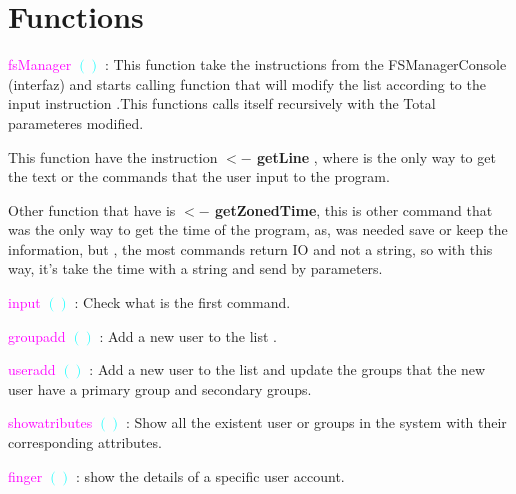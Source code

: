 \documentclass{aes2e}
\begin{document}
\section{Functions}



\begin{alphalist}[style=sameline]
\item{}\textcolor{Magenta}{fsManager } \textcolor{Cyan}{$()$} :   This function take the instructions from the FSManagerConsole (interfaz) and starts calling function that will modify the list according  to the input instruction .This functions calls itself recursively with the Total parameteres modified. \newline

This function have the instruction \textbf{ $<-$ getLine }, where is the only way to get the text or the commands that the user input to the program.\newline

Other function that have is \textbf{ $<-$ getZonedTime}, this is other command that was the only way to get the time of the program, as, was needed save or keep the information, but , the most commands return IO and not a string, so with this way, it's take the time with a string and send by parameters.\newline

\item{}\textcolor{Magenta}{input } \textcolor{Cyan}{$()$} : Check what is the first command. \newline


\item{}\textcolor{Magenta}{groupadd } \textcolor{Cyan}{$()$} : Add a new user to the list . \newline

\item{}\textcolor{Magenta}{useradd } \textcolor{Cyan}{$()$} : Add a new user to the list and update the groups that the new user have a primary group and secondary groups. \newline

\item{}\textcolor{Magenta}{showatributes  } \textcolor{Cyan}{$()$} : Show all the existent user or groups in the
system with their corresponding attributes. \newline

\item{}\textcolor{Magenta}{finger  } \textcolor{Cyan}{$()$} : show the details of a specific user account. \newline


\end{alphalist}
\end{document}
